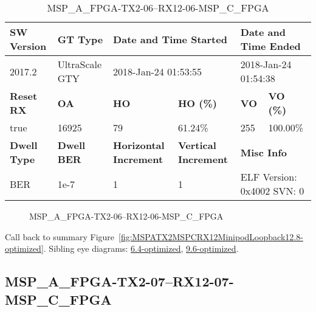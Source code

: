 \begin{table}[h]
\centering
\caption{MSP\_A\_FPGA-TX2-06--RX12-06-MSP\_C\_FPGA}
\label{tab:MSPAFPGATX206RX1206MSPCFPGA12.8-optimized}
\begin{tabular}{@{}|l|l|l|l|l|l|@{}}
\toprule
\textbf{SW Version}                & \textbf{GT Type}   & \multicolumn{2}{l|}{\textbf{Date and Time Started}}            & \multicolumn{2}{l|}{\textbf{Date and Time Ended}}        \\ \midrule
2017.2                       & UltraScale GTY          & \multicolumn{2}{l|}{2018-Jan-24 01:53:55}                   & \multicolumn{2}{l|}{2018-Jan-24 01:54:38}               \\ \midrule
\textbf{Reset RX}                  & \textbf{OA} & \textbf{HO}   & \textbf{HO (\%)} & \textbf{VO} & \textbf{VO (\%)} \\ \midrule
true & 16925        & 79          & 61.24\%        & 255        & 100.00\%       \\ \midrule
\textbf{Dwell Type}                & \textbf{Dwell BER} & \textbf{Horizontal Increment} & \textbf{Vertical Increment}    & \multicolumn{2}{l|}{\textbf{Misc Info}}                  \\ \midrule
BER                            & 1e-7        & 1        & 1           & \multicolumn{2}{l|}{ELF Version: 0x4002 SVN: 0}                         \\ \bottomrule
\end{tabular}
\end{table}

\begin{figure}[h]
\caption{MSP\_A\_FPGA-TX2-06--RX12-06-MSP\_C\_FPGA} \label{fig:MSPAFPGATX206RX1206MSPCFPGA12.8-optimized}
\end{figure}

Call back to summary Figure~\ref{fig:MSPATX2MSPCRX12MinipodLoopback12.8-optimized}.
Sibling eye diagrams: \hyperref[sec:MSPAFPGATX206RX1206MSPCFPGA6.4-optimized]{6.4-optimized}, \hyperref[sec:MSPAFPGATX206RX1206MSPCFPGA9.6-optimized]{9.6-optimized}.

\clearpage
\newpage


\subsection{MSP\_A\_FPGA-TX2-07--RX12-07-MSP\_C\_FPGA}\label{sec:MSPAFPGATX207RX1207MSPCFPGA12.8-optimized}

